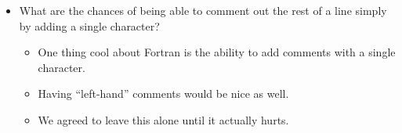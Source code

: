 \begin{itemize}
\item What are the chances of being able to comment out the rest of a line simply by adding a single character?
 \begin{itemize}
 \item
One thing cool about Fortran is the ability to add comments with a single character.
 \item
Having ``left-hand'' comments would be nice as well.
 \item
We agreed to leave this alone until it actually hurts.
 \end{itemize}

\end{itemize}
